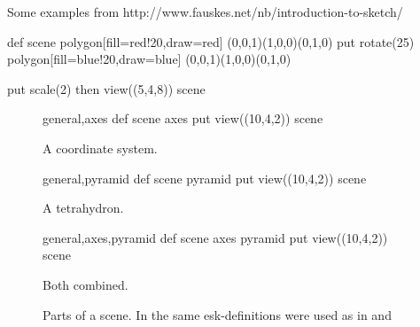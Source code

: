 \documentclass[12pt]{article}
\makeatletter
\newenvironment{SubFloat}[2][]%
{\def\sf@one{#1}%
	\def\sf@two{#2}%
		\setbox\sf@box\hbox
		\bgroup}%
{ \egroup
	\ifx\@empty\sf@two\@empty\relax
		\def\sf@two{\@empty}
	\fi
	\ifx\@empty\sf@one\@empty\relax
		\subfloat[\sf@two]{\box\sf@box}%
	\else
		\subfloat[\sf@one][\sf@two]{\box\sf@box}%
	\fi}
\makeatother
\begin{document}
	Some examples from http://www.fauskes.net/nb/introduction-to-sketch/	
	\begin{center}
		\begin{esk}{}
			def scene{
			    polygon[fill=red!20,draw=red]
				(0,0,1)(1,0,0)(0,1,0)
			    put {rotate(25)} {polygon[fill=blue!20,draw=blue]
				(0,0,1)(1,0,0)(0,1,0)}
			}

			put { scale(2) then view((5,4,8)) } {scene}
		\end{esk}
		
		\begin{figure}[ht]
			\centering
			\begin{SubFloat}{\label{fig:verbone}A coordinate system.}
				\begin{minipage}[t]{1.5in}
					\centering
					\begin{esk}{general,axes}
						def scene {
							{axes}
						}
						put { view((10,4,2)) } {scene}
					\end{esk}
				\end{minipage}%
			\end{SubFloat}%
			\begin{SubFloat}{\label{fig:verbtwo}A tetrahydron.}
				\begin{minipage}[t]{1.5in}
					\centering
					\begin{esk}{general,pyramid}
						def scene {
							{pyramid}
						}
						put { view((10,4,2)) } {scene}
					\end{esk}
				\end{minipage}%
			\end{SubFloat}%
			\begin{SubFloat}{\label{fig:verbthree}Both combined.}
				\begin{minipage}[t]{1.5in}
					\centering
					\begin{esk}{general,axes,pyramid}
						def scene {
							{axes}
							{pyramid}
						}
						put { view((10,4,2)) } {scene}
					\end{esk}
				\end{minipage}%
			\end{SubFloat}%
			\label{fig:verbatim}
			\caption{Parts of a scene. In  the same esk-definitions were used as in  and }
		\end{figure}
		
	\end{center}
\end{document}
